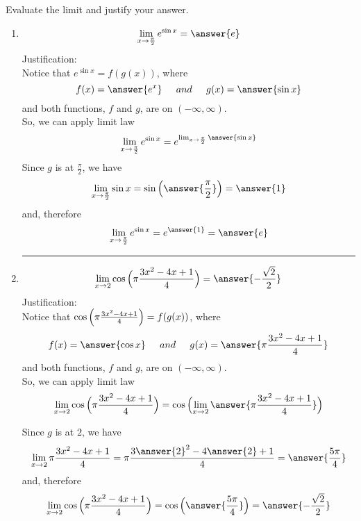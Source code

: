 \documentclass{ximera}
\author{Nela Lakos}
\begin{document}
\begin{exercise}
Evaluate the limit and justify your answer.\\
\begin{enumerate}
\item
 \[
\lim_{x\to \frac{\pi}{2}}e^{\sin{x}} =\answer{e}  
\] 
Justification:\\[1em]
Notice that $e^{\sin{x}} =f(g(x)) $, where
\[
 f(x)=\answer{e^{x}} \hspace{0.2in}and \hspace{0.2in} g(x)=\answer{\sin{x}}
\] 
and both functions, $f$ and $g$,  are   on $ (-\infty,\infty)$.\\
So, we can apply
  limit law 
 \[
\lim_{x\to \frac{\pi}{2}}e^{\sin{x}} = e^{\lim_{x\to \frac{\pi}{2}}\answer{\sin{x}}}
\] 
Since $g$ is   at $\frac{\pi}{2}$, we have
 \[
\lim_{x\to \frac{\pi}{2}}\sin{x}=\sin{\Bigl(\answer{\frac{\pi}{2}}\Bigr)}=\answer{1}
\] 
and, therefore
\[
\lim_{x\to \frac{\pi}{2}}e^{\sin{x}} =e^{\answer{1}}  =\answer{e}
\] 
\noindent\rule[0.5ex]{\linewidth}{.2pt}

\item
 \[
\lim_{x\to2}\cos{\Bigl(\pi\frac{3x^{2}-4x+1}{4}\Bigr)} = \answer{-\frac{\sqrt{2}}{2}}
\] 
Justification:\\ 
Notice that $\cos{\Bigl(\pi\frac{3x^{2}-4x+1}{4}\Bigr)}=f(g(x)) $, where
\[
 f(x)=\answer{\cos{x}} \hspace{0.2in}and \hspace{0.2in} g(x)=\answer{\pi\frac{3x^{2}-4x+1}{4}}
\] 
and both functions, $f$ and $g$,  are   on $ (-\infty,\infty)$.\\
So, we can apply
  limit law 
 \[
\lim_{x\to2}\cos{\Bigl(\pi\frac{3x^{2}-4x+1}{4}\Bigr)}  =\cos{\Bigl(\lim_{x\to2}\answer{\pi\frac{3x^{2}-4x+1}{4}}\Bigr)} 
\] 

Since $g$ is   at $2$, we have
 \[
\lim_{x\to2}\pi\frac{3x^{2}-4x+1}{4}=\pi\frac{3\answer{2}^{2}-4\answer{2}+1}{4}=\answer{\frac{5\pi}{4}}
\]
and, therefore
\[
\lim_{x\to2}\cos{\Bigl(\pi\frac{3x^{2}-4x+1}{4}\Bigr)} =\cos{\Bigl(\answer{\frac{5\pi}{4}} \Bigr)}= \answer{-\frac{\sqrt{2}}{2}}
\] 


\end{enumerate}
\end{exercise}
\end{document}
